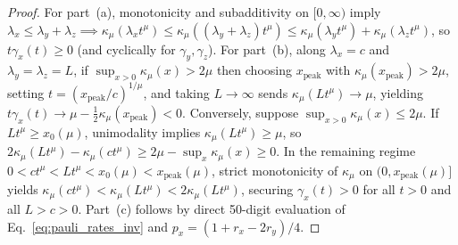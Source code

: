 \documentclass[twocolumn,10pt,amsmath,amssymb,floatfix]{revtex4-2}
\theoremstyle{plain}
\theoremstyle{definition}
\begin{document}
\begin{proof}
For part~(a), monotonicity and subadditivity on $[0,\infty)$ imply $\lambda_x \le \lambda_y + \lambda_z \implies \kappa_\mu(\lambda_x t^\mu) \le \kappa_\mu((\lambda_y + \lambda_z)t^\mu) \le \kappa_\mu(\lambda_y t^\mu) + \kappa_\mu(\lambda_z t^\mu)$, so $t\gamma_x(t) \ge 0$ (and cyclically for $\gamma_y, \gamma_z$). For part~(b), along $\lambda_x = c$ and $\lambda_y = \lambda_z = L$, if $\sup_{x>0}\kappa_\mu(x) > 2\mu$ then choosing $x_{\mathrm{peak}}$ with $\kappa_\mu(x_{\mathrm{peak}}) > 2\mu$, setting $t = (x_{\mathrm{peak}}/c)^{1/\mu}$, and taking $L \to \infty$ sends $\kappa_\mu(Lt^\mu) \to \mu$, yielding $t\gamma_x(t) \to \mu - \frac{1}{2}\kappa_\mu(x_{\mathrm{peak}}) < 0$. Conversely, suppose $\sup_{x>0}\kappa_\mu(x) \le 2\mu$. If $L t^\mu \ge x_0(\mu)$, unimodality implies $\kappa_\mu(Lt^\mu) \ge \mu$, so $2\kappa_\mu(Lt^\mu) - \kappa_\mu(ct^\mu) \ge 2\mu - \sup_x \kappa_\mu(x) \ge 0$. In the remaining regime $0 < c t^\mu < L t^\mu < x_0(\mu) < x_{\mathrm{peak}}(\mu)$, strict monotonicity of $\kappa_\mu$ on $(0, x_{\mathrm{peak}}(\mu)]$ yields $\kappa_\mu(ct^\mu) < \kappa_\mu(Lt^\mu) < 2\kappa_\mu(Lt^\mu)$, securing $\gamma_x(t) > 0$ for all $t > 0$ and all $L > c > 0$. Part~(c) follows by direct 50-digit evaluation of Eq.~\eqref{eq:pauli_rates_inv} and $p_x = (1 + r_x - 2r_y)/4$.
\end{proof}
\end{document}
